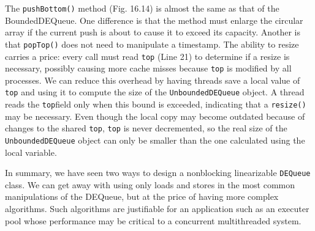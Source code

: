 The \lstinline!pushBottom()! method (Fig. 16.14) is almost the same as
that of the BoundedDEQueue. One difference is that the method must
enlarge the circular array if the current push is about to cause it to
exceed its capacity. Another is that \lstinline!popTop()! does not
need to manipulate a timestamp. The ability to resize carries a price:
every call must read \lstinline!top! (Line 21) to determine if a
resize is necessary, possibly causing more cache misses because
\lstinline!top! is modified by all processes. We can reduce this
overhead by having threads save a local value of \lstinline!top! and
using it to compute the size of the \lstinline!UnboundedDEQueue!
object. A thread reads the \lstinline!top!field only when this bound
is exceeded, indicating that a \lstinline!resize()! may be necessary.
Even though the local copy may become outdated because of changes to
the shared \lstinline!top!, \lstinline!top! is never decremented, so
the real size of the \lstinline!UnboundedDEQueue! object can only be
smaller than the one calculated using the local variable.

In summary, we have seen two ways to design a nonblocking linearizable
\lstinline!DEQueue! class. We can get away with using only loads and
stores in the most common manipulations of the DEQueue, but at the
price of having more complex algorithms. Such algorithms are
justifiable for an application such as an executer pool whose
performance may be critical to a concurrent multithreaded system.












